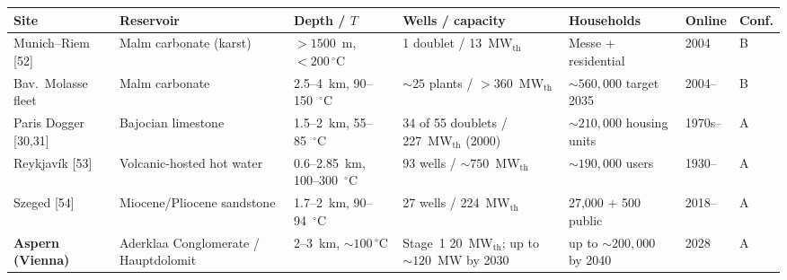\documentclass{article}
\begin{document}
\begin{center}
\begin{tabular}{lllllll}
\hline
\textbf{Site} & \textbf{Reservoir} & \textbf{Depth / $T$} & \textbf{Wells / capacity} & \textbf{Households} & \textbf{Online} & \textbf{Conf.} \\
\hline
Munich--Riem [52]    & Malm carbonate (karst)      & $> 1500$~m, $<200\,^\circ$C    & 1 doublet / 13~MW$_{\mathrm{th}}$ & Messe + residential & 2004 & B \\
Bav.\ Molasse fleet  & Malm carbonate              & 2.5--4~km, 90--150~$^\circ$C   & $\sim 25$ plants / $> 360$~MW$_{\mathrm{th}}$ & $\sim 560{,}000$ target 2035 & 2004-- & B \\
Paris Dogger [30,31] & Bajocian limestone          & 1.5--2~km, 55--85~$^\circ$C    & 34 of 55 doublets / 227~MW$_{\mathrm{th}}$ (2000) & $\sim 210{,}000$ housing units & 1970s-- & A \\
Reykjav\'{i}k [53]   & Volcanic-hosted hot water   & 0.6--2.85~km, 100--300~$^\circ$C & 93 wells / $\sim 750$~MW$_{\mathrm{th}}$ & $\sim 190{,}000$ users & 1930-- & A \\
Szeged [54]          & Miocene/Pliocene sandstone  & 1.7--2~km, 90--94~$^\circ$C    & 27 wells / 224~MW$_{\mathrm{th}}$ & 27{,}000 + 500 public  & 2018-- & A \\
\textbf{Aspern (Vienna)} & Aderklaa Conglomerate / Hauptdolomit & 2--3~km, $\sim 100\,^\circ$C & Stage~1 20~MW$_{\mathrm{th}}$; up to $\sim 120$~MW by 2030 & up to $\sim 200{,}000$ by 2040 & 2028 & A \\
\hline
\end{tabular}
\end{center}
\end{document}
